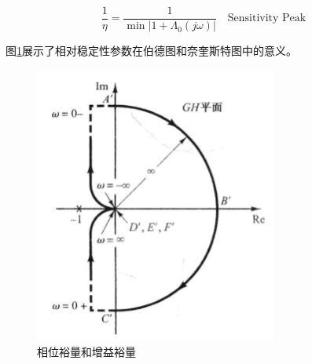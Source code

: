 \begin{equation*}
    \frac{1}{\eta}=\frac{1}{\min|1+\Lambda_0(j\omega)|}\quad\mbox{Sensitivity Peak}
\end{equation*}

图\ref{29}展示了相对稳定性参数在伯德图和奈奎斯特图中的意义。

\begin{figure}[!ht]
    \centering
    \includegraphics[width=8cm]{figures/29.png}
    \caption{相位裕量和增益裕量}
    \label{29}
\end{figure}
